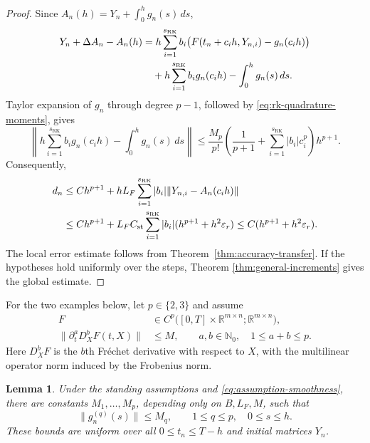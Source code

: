 \documentclass[]{article}
\numberwithin{equation}{section}
\theoremstyle{plain}
\newtheorem{lemma}[theorem]{Lemma}
\theoremstyle{remark}
\numberwithin{algorithm}{section}
\newcommand{\R}{\mathbb{R}}
\newcommand{\eps}{\varepsilon}
\begin{document}
\begin{proof}
Since \(A_n(h)=Y_n+\int_0^h g_n(s)\,ds\),
\begin{align}
 Y_n+\Delta A_n-A_n(h)
 &=h\sum_{i=1}^{s_{\mathrm{RK}}}b_i
   \bigl(F(t_n+c_i h,Y_{n,i})-g_n(c_i h)\bigr)\notag\\
 &\quad+h\sum_{i=1}^{s_{\mathrm{RK}}}b_i g_n(c_i h)
       -\int_0^h g_n(s)\,ds.
 \label{eq:rk-criterion-decomposition}
\end{align}
Taylor expansion of \(g_n\) through degree \(p-1\), followed by
\eqref{eq:rk-quadrature-moments}, gives
\begin{equation}\label{eq:rk-criterion-quadrature}
 \left\|h\sum_{i=1}^{s_{\mathrm{RK}}}b_i g_n(c_i h)
        -\int_0^h g_n(s)\,ds\right\|
 \le \frac{M_p}{p!}
 \left(\frac1{p+1}+\sum_{i=1}^{s_{\mathrm{RK}}}|b_i|c_i^p\right)h^{p+1}.
\end{equation}
Consequently,
\begin{align}
 d_n
 &\le C h^{p+1}
   +hL_F\sum_{i=1}^{s_{\mathrm{RK}}}|b_i|
           \|Y_{n,i}-A_n(c_i h)\|\notag\\
 &\le C h^{p+1}
   +L_F C_{\rm st}\sum_{i=1}^{s_{\mathrm{RK}}}|b_i|
        (h^{p+1}+h^2\eps_r)
 \le C(h^{p+1}+h^2\eps_r).
 \label{eq:rk-criterion-defect}
\end{align}
The local error estimate follows from Theorem~\ref{thm:accuracy-transfer}.
If the hypotheses hold uniformly over the steps, Theorem
\ref{thm:general-increments} gives the global estimate.
\end{proof}


For the two examples below, let \(p\in\{2,3\}\) and assume
\begin{equation}\label{eq:assumption-smoothness}
 \begin{aligned}
  F&\in C^p\bigl([0,T]\times\R^{m\times n};\R^{m\times n}\bigr),\\
  \|\partial_t^aD_X^bF(t,X)\|&\le M,
  \qquad a,b\in\mathbb N_0,\quad 1\le a+b\le p.
 \end{aligned}
\end{equation}
Here \(D_X^bF\) is the \(b\)th Fr\'echet derivative with respect to \(X\),
with the multilinear operator norm induced by the Frobenius norm.

\begin{lemma}
\label{lem:flow-derivatives}
Under the standing assumptions and
\eqref{eq:assumption-smoothness}, there are constants \(M_1,\ldots,M_p\),
depending only on \(B,L_F,M\), such that
\begin{equation}\label{eq:flow-derivative-bounds}
 \|g_n^{(q)}(s)\|\le M_q,
 \qquad 1\le q\le p,\quad 0\le s\le h.
\end{equation}
These bounds are uniform over all \(0\le t_n\le T-h\) and initial
matrices \(Y_n\).
\end{lemma}
\end{document}
